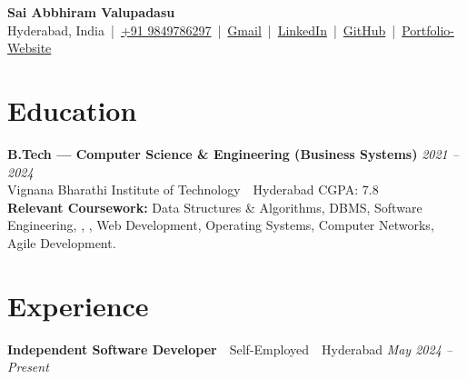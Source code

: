 \documentclass[10pt,a4paper]{article}
\begin{document}
	
	\begin{center}
		
		{\LARGE \textbf{Sai Abbhiram Valupadasu}}\\[6pt]
		Hyderabad, India \,|\,
		\href{tel:+91 9849786297}{+91 9849786297} \,|\,
		\href{mailto:valupadasusaiabbhiram@gmail.com}{Gmail} \,|\,
		\href{https://www.linkedin.com/in/Sai-Abbhiram-Valupadasu}{LinkedIn} \,|\,
		\href{https://github.com/ValupadasuSaiabbhiram}{GitHub} \,|\,
		\href{https://personal-portfolio-tan-nine-78.vercel.app/}{Portfolio-Website}
		
	\end{center}
	
	\section*{Education}
	
	
	\textbf{B.Tech — Computer Science \& Engineering (Business Systems)} \hfill \textit{2021 -- 2024}\\
	Vignana Bharathi Institute of Technology \,\textbar \, Hyderabad \hfill CGPA: 7.8 
	\vspace{0.3em}  %
	\\ \textbf{Relevant Coursework:} Data Structures \& Algorithms, DBMS, Software Engineering, , , Web Development, Operating Systems, Computer Networks, Agile Development.
	
	
	\section*{Experience}
	
	\textbf{Independent Software Developer}\, \textbar \, Self-Employed \,\textbar \, Hyderabad \hfill \textit{May 2024 -- Present}
	
\end{document}
